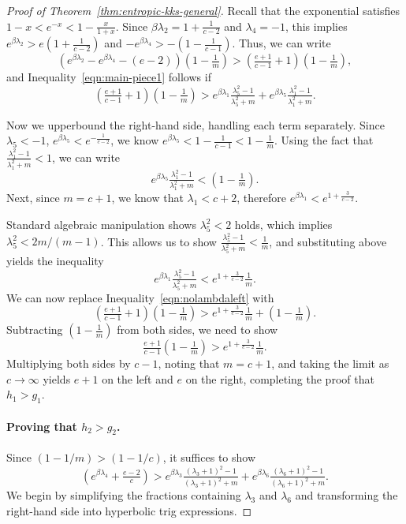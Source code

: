 \begin{proof}[Proof of Theorem~\ref{thm:entropic-kks-general}]
    Recall that the exponential satisfies $1- x < e^{-x} < 1 - \tfrac{x}{1+x}$.
    Since $\beta\lambda_2 = 1+\tfrac{1}{c-2}$ and $\lambda_4 = -1$, this implies
    $e^{\beta\lambda_2} > e(1 + \tfrac{1}{c-2})$
    and
    $-e^{\beta\lambda_4} > -(1 - \tfrac{1}{c-1}).$
    Thus, we can write
    \[
        \left(e^{\beta\lambda_2}-e^{\beta\lambda_4} - (e - 2) \right)(1 - \tfrac{1}{m}) > (\tfrac{e+1}{c-1} + 1)(1 - \tfrac{1}{m}),
    \]
    and Inequality~\eqref{eqn:main-piece1} follows if
    \begin{equation}\label{eqn:nolambdaleft}
      (\tfrac{e+1}{c-1} + 1)(1 - \tfrac{1}{m}) > e^{\beta\lambda_1} \tfrac{\lambda_5^2 - 1}{\lambda_5^2 + m} + e^{\beta\lambda_5}\tfrac{\lambda_1^2 - 1}{\lambda_1^2+m}.
    \end{equation}

    Now we upperbound the right-hand side, handling
    each term separately. Since $\lambda_5 < -1$, $e^{\beta \lambda_5} < e^{-\tfrac{1}{c-2}}$,
    we know $e^{\beta \lambda_5} < 1 - \tfrac{1}{c-1} < 1 - \tfrac{1}{m}$.
    Using the fact that $\tfrac{\lambda_1^2 - 1}{\lambda_1^2 + m} < 1$, we can write
    \[
        e^{\beta \lambda_5} \tfrac{\lambda_1^2 - 1}{\lambda_1^2 + m} < (1 - \tfrac{1}{m}).
    \]
    Next, since $m = c+1$, we know that $\lambda_1 < c+2$, therefore
    $e^{\beta \lambda_1} < e^{ 1 + \tfrac{3}{c-2}}$.

    Standard algebraic manipulation shows $\lambda_5^2 < 2$ holds,
    which implies $\lambda_5^2 < 2 m/(m-1)$.
    This allows us to show $\tfrac{\lambda_5^2-1}{\lambda_5^2 + m} < \tfrac{1}{m}$,
    and substituting above yields the inequality
    \[
        e^{\beta \lambda_1} \tfrac{\lambda_5^2-1}{\lambda_5^2 + m} < e^{1 + \tfrac{3}{c-2}}\tfrac{1}{m}.
    \]
    We can now replace Inequality~\eqref{eqn:nolambdaleft} with
    \[
        (\tfrac{e+1}{c-1} + 1)(1 - \tfrac{1}{m})
        > e^{1 + \tfrac{3}{c-2}}\tfrac{1}{m} + (1 - \tfrac{1}{m}).
    \]
    Subtracting $(1-\tfrac{1}{m})$ from both sides, we need to show
    \[
        \tfrac{e+1}{c-1}(1 - \tfrac{1}{m})
        >  e^{1 + \tfrac{3}{c-2}}\tfrac{1}{m}.
    \]
    Multiplying both sides by $c-1$, noting that $m = c+1$, and taking the limit as $c\rightarrow \infty$
    yields $e+1$ on the left and $e$ on the right, completing the proof that $h_1 > g_1$.

    \paragraph{Proving that $h_2 > g_2$.}
    Since $(1-1/m) > (1-1/c)$, it suffices to show
    \begin{equation}\label{eqn:g2h2}
      \left(e^{\beta \lambda_4} + \tfrac{e-2}{c}\right)
      >
      e^{\beta\lambda_3} \tfrac{(\lambda_3+1)^2-1}{(\lambda_3+1)^2+m} + e^{\beta \lambda_6} \tfrac{(\lambda_6+1)^2-1}{(\lambda_6+1)^2+m}.
    \end{equation}
    We begin by simplifying the fractions containing $\lambda_3$ and $\lambda_6$ and transforming the right-hand side into hyperbolic trig expressions.


\end{proof}
